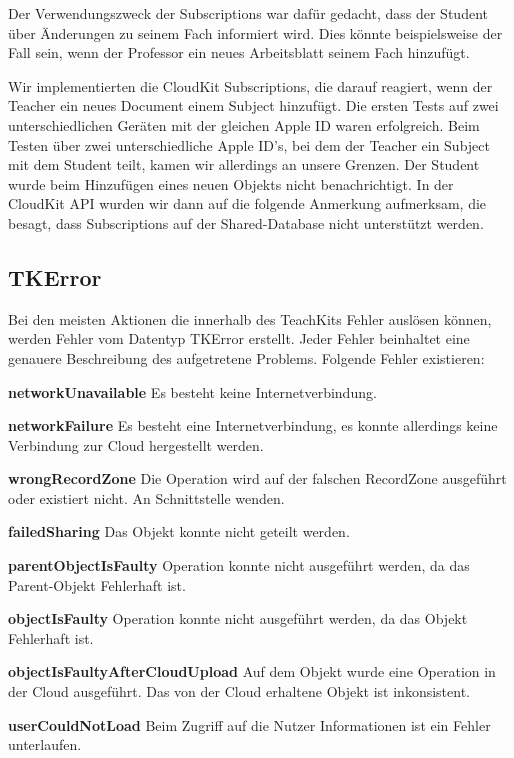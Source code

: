 Der Verwendungszweck der Subscriptions war dafür gedacht, dass der Student über Änderungen zu seinem Fach informiert wird. Dies könnte beispielsweise der Fall sein, wenn der Professor ein neues Arbeitsblatt seinem Fach hinzufügt.

Wir implementierten die CloudKit Subscriptions, die darauf reagiert, wenn der Teacher ein neues Document einem Subject hinzufügt.
Die ersten Tests auf zwei unterschiedlichen Geräten mit der gleichen Apple ID waren erfolgreich. Beim Testen über zwei unterschiedliche Apple ID’s, bei dem der Teacher ein Subject mit dem Student teilt, kamen wir allerdings an unsere Grenzen. Der Student wurde beim Hinzufügen eines neuen Objekts nicht benachrichtigt.
In der CloudKit API wurden wir dann auf die folgende Anmerkung aufmerksam, die besagt, dass Subscriptions auf der Shared-Database nicht unterstützt werden.

\newpage

\subsection{TKError}

Bei den meisten Aktionen die innerhalb des TeachKits Fehler auslösen können, werden Fehler vom Datentyp TKError erstellt. Jeder Fehler beinhaltet eine genauere Beschreibung des aufgetretene Problems. Folgende Fehler existieren:

\textbf{networkUnavailable}
Es besteht keine Internetverbindung.

\textbf{networkFailure}
Es besteht eine Internetverbindung, es konnte allerdings keine Verbindung zur Cloud hergestellt werden.

\textbf{wrongRecordZone}
Die Operation wird auf der falschen RecordZone ausgeführt oder existiert nicht. An Schnittstelle wenden.

\textbf{failedSharing}
Das Objekt konnte nicht geteilt werden.

\textbf{parentObjectIsFaulty}
Operation konnte nicht ausgeführt werden, da das Parent-Objekt Fehlerhaft ist.

\textbf{objectIsFaulty}
Operation konnte nicht ausgeführt werden, da das Objekt Fehlerhaft ist.

\textbf{objectIsFaultyAfterCloudUpload}
Auf dem Objekt wurde eine Operation in der Cloud ausgeführt. Das von der Cloud erhaltene Objekt ist inkonsistent.

\textbf{userCouldNotLoad}
Beim Zugriff auf die Nutzer Informationen ist ein Fehler unterlaufen.

